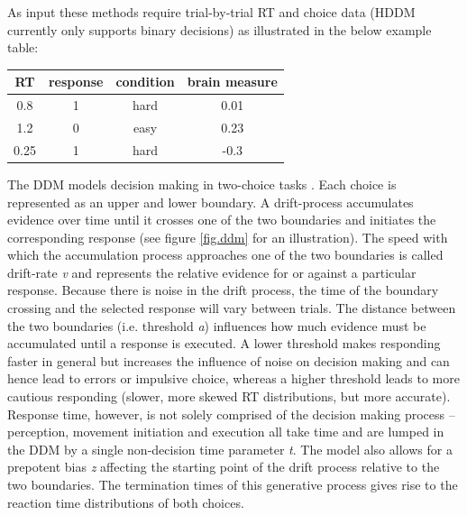 \documentclass[letterpaper,10pt,english]{article}
\begin{document}
As input these methods require trial-by-trial RT and choice data (HDDM currently only supports binary decisions) as illustrated in the below example table:

\begin{tabular}{c|c|c|c}
RT & response & condition & brain measure \\
\hline
0.8 & 1 & hard & 0.01 \\
1.2 & 0 & easy & 0.23 \\
0.25 & 1 & hard & -0.3
\end{tabular}

The DDM models decision making in two-choice tasks . Each choice is represented as an upper and lower boundary. A drift-process accumulates evidence over time until it crosses one of the two boundaries and initiates the corresponding response \citep{RatcliffRouder98,SmithRatcliff04} (see figure \ref{fig.ddm} for an illustration). The speed with which the accumulation process approaches one of the two boundaries is called drift-rate \emph{v} and represents the relative evidence for or against a particular response. Because there is noise in the drift process, the time of the boundary crossing and the selected response will vary between trials. The distance between the two boundaries (i.e. threshold \emph{a}) influences how much evidence must be accumulated until a response is executed. A lower threshold makes responding faster in general but increases the influence of noise on decision making and can hence lead to errors or impulsive choice, whereas a higher threshold leads to more cautious responding (slower, more skewed RT distributions, but more accurate). Response time, however, is not solely comprised of the decision making process -- perception, movement initiation and execution all take time and are lumped in the DDM by a single non-decision time parameter \emph{t}. The model also allows for a prepotent bias \emph{z} affecting the starting point of the drift process relative to the two boundaries. The termination times of this generative process gives rise to the reaction time distributions of both choices.
\end{document}
